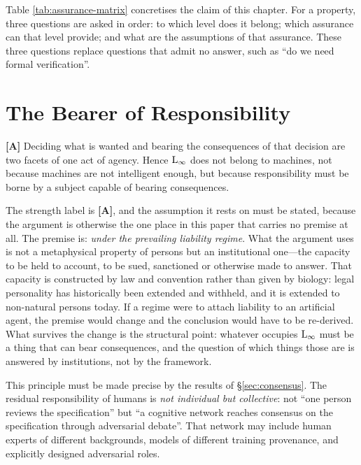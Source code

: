 Table \ref{tab:assurance-matrix} concretises the claim of this chapter. For a property, three
questions are asked in order: to which level does it belong; which assurance can that level
provide; and what are the assumptions of that assurance. These three questions replace
questions that admit no answer, such as ``do we need formal verification''.

\section{The Bearer of Responsibility}\label{sec:linf}

\begin{principle}\label{pr:responsibility}\textbf{[A]}
Deciding what is wanted and bearing the consequences of that decision are two facets of one
act of agency. Hence $\mathrm{L}_{\infty}$ does not belong to machines, not because machines are not
intelligent enough, but because responsibility must be borne by a subject capable of bearing
consequences.
\end{principle}

The strength label is \textbf{[A]}, and the assumption it rests on must be stated, because the
argument is otherwise the one place in this paper that carries no premise at all. The premise is:
\emph{under the prevailing liability regime}. What the argument uses is not a metaphysical property
of persons but an institutional one---the capacity to be held to account, to be sued, sanctioned or
otherwise made to answer. That capacity is constructed by law and convention rather than given by
biology: legal personality has historically been extended and withheld, and it is extended to
non-natural persons today. If a regime were to attach liability to an artificial agent, the
premise would change and the conclusion would have to be re-derived. What survives the change is the
structural point: whatever occupies $\mathrm{L}_{\infty}$ must be a thing that can bear consequences, and
the question of which things those are is answered by institutions, not by the framework.

This principle must be made precise by the results of \S\ref{sec:consensus}. The residual
responsibility of humans is \emph{not individual but collective}: not ``one person reviews
the specification'' but ``a cognitive network reaches consensus on the specification through
adversarial debate''. That network may include human experts of different backgrounds, models
of different training provenance, and explicitly designed adversarial roles.

